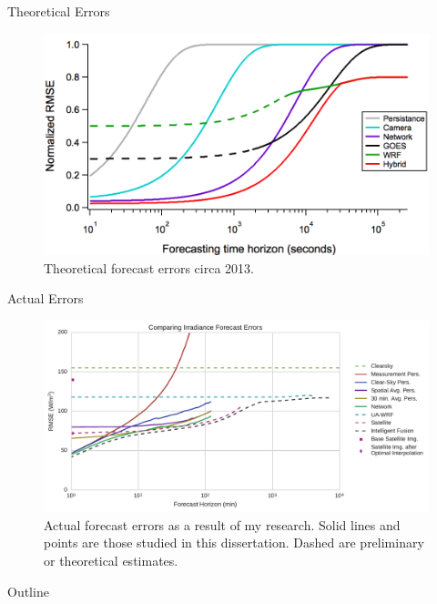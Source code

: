 \documentclass[aspectratio=169]{beamer}
\begin{document}
\begin{frame}{Theoretical Errors}
\begin{figure}[h]
  \includegraphics[height=.7\textheight]{figs/original_bullshit.png}
  \caption{Theoretical forecast errors circa 2013.}
\end{figure}
\end{frame}

\begin{frame}{Actual Errors}
\begin{figure}[h]
  \includegraphics[width=.7\textwidth]{../dissertation/figs/timehorizon.pdf}
  \caption{Actual forecast errors as a result of my research. Solid lines
    and points are those studied in this dissertation. Dashed are preliminary
    or theoretical estimates.}
\end{figure}
\end{frame}


\begin{frame}{Outline}
  \tableofcontents
\end{frame}
\end{document}
